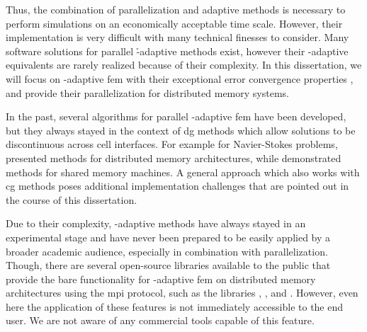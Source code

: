 
Thus, the combination of parallelization and adaptive methods is necessary to perform simulations on an economically acceptable time scale. However, their implementation is very difficult with many technical finesses to consider.
Many software solutions for parallel \h-adaptive methods exist, however their \hp-adaptive equivalents are rarely realized because of their complexity.
In this dissertation, we will focus on \hp-adaptive \gls{fem} with their exceptional error convergence properties \parencite{guo1986,babuska1996}, and provide their parallelization for distributed memory systems.



In the past, several algorithms for parallel \hp-adaptive \gls{fem} have been developed, but they always stayed in the context of \gls{dg} methods which allow solutions to be discontinuous across cell interfaces. For example for Navier-Stokes problems, \textcites{paszynski2006}{chalmers2019} presented methods for distributed memory architectures, while \textcites{paszynski2011}{jomo2017} demonstrated methods for shared memory machines. A general approach which also works with \gls{cg} methods poses additional implementation challenges that are pointed out in the course of this dissertation. %


Due to their complexity, \hp-adaptive methods have always stayed in an experimental stage and have never been prepared to be easily applied by a broader academic audience, especially in combination with parallelization.
Though, there are several open-source libraries available to the public that provide the bare functionality for \hp-adaptive \gls{fem} on distributed memory architectures using the \gls{mpi} protocol, such as the libraries \phaml{} \parencite{mitchell2002,phaml1200}, \phg{} \parencite{zhang2019,phg094}, and \mofem{} \parencite{kaczmarczyk2020,mofem090}. However, even here the application of these features is not immediately accessible to the end user. We are not aware of any commercial tools capable of this feature.

